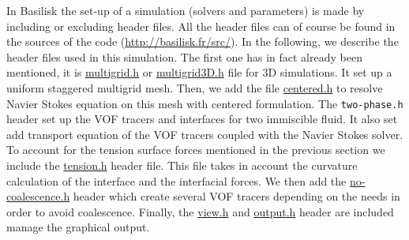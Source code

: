 In Basilisk the set-up of a simulation (solvers and parameters) is made by including or excluding header files.
All the header files can of course be found in the sources of the code (\url{http://basilisk.fr/src/}).   
In the following, we describe the header files used in this simulation. 
The first one has in fact already been mentioned, it is \href{http://basilisk.fr/src/grid/multigrid.h}{multigrid.h} or  \href{http://basilisk.fr/src/grid/multigrid3D.h}{multigrid3D.h} file for 3D simulations. 
It set up a uniform staggered multigrid mesh. 
Then, we add the file \href{http://basilisk.fr/src/navier-stokes/centered.h}{centered.h} to resolve Navier Stokes equation on this mesh with centered formulation.
The \texttt{two-phase.h} header set up the VOF tracers and interfaces for two immiscible fluid.
It also set add transport equation of the VOF tracers coupled with the Navier Stokes solver.
To account for the tension surface forces mentioned in the previous section we include the \href{http://basilisk.fr/src/tension.h}{tension.h} header file. 
This file takes in account the curvature calculation of the interface and the interfacial forces. 
We then add the \href{http://basilisk.fr/sandbox/fintzin/Rising-Suspension/no-coalescence.h}{no-coalescence.h} header which create several VOF tracers depending on the needs in order to avoid coalescence. 
Finally, the \href{http://basilisk.fr/src/view.h}{view.h} and \href{http://basilisk.fr/src/output.h}{output.h} header are included manage the graphical output.  


